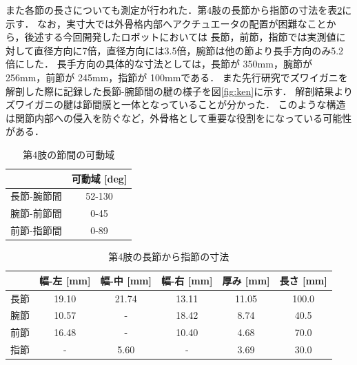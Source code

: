 また各節の長さについても測定が行われた．第4肢の長節から指節の寸法を表\ref{tab:4setu}に示す．
なお，実寸大では外骨格内部へアクチュエータの配置が困難なことから，後述する今回開発したロボットにおいては
長節，前節，指節では実測値に対して直径方向に7倍，直径方向には3.5倍，腕節は他の節より長手方向のみ5.2倍にした．
長手方向の具体的な寸法としては，長節が 350mm，腕節が 256mm，前節が 245mm，指節が 100mmである．
また先行研究\cite{hasegawa}でズワイガニを解剖した際に記録した長節-腕節間の腱の様子を図\ref{fig:ken}に示す．
解剖結果よりズワイガニの腱は節間膜と一体となっていることが分かった\cite{hasegawa}．
このような構造は関節内部への侵入を防ぐなど，外骨格として重要な役割をになっている可能性がある．
\begin{table}[t]
  \centering
  \vspace{5mm}
  \caption{第4肢の節間の可動域}
  \label{tab:4setukadou}
  \vspace{-3mm}
  \begin{tabular}{|l|c|}
  \hline
         & \multicolumn{1}{l|}{可動域 {[}deg{]}} \\ \hline
  長節-腕節間 & 52-130                            \\ \hline
  腕節-前節間 & 0-45                             \\ \hline
  前節-指節間 & 0-89                            \\ \hline
  \end{tabular}
\end{table}
\begin{table}[t]
  \centering
  \caption{第4肢の長節から指節の寸法}
  \label{tab:4setu}
  \vspace{-3mm}
  \begin{tabular}{|l|c|c|c|c|c|}
  \hline
     & \multicolumn{1}{l|}{幅-左 [mm]} & \multicolumn{1}{l|}{幅-中 [mm]} & \multicolumn{1}{l|}{幅-右 [mm]} & \multicolumn{1}{l|}{厚み [mm]} & \multicolumn{1}{l|}{長さ [mm]} \\ \hline
  長節 & 19.10                       & 21.74                       & 13.11                       & 11.05                       & 100.0                       \\ \hline
  腕節 & 10.57                       & -                           & 18.42                       & 8.74                        & 40.5                        \\ \hline
  前節 & 16.48                       & -                           & 10.40                       & 4.68                        & 70.0                        \\ \hline
  指節 & -                           & 5.60                        & -                           & 3.69                        & 30.0                        \\ \hline
  \end{tabular}
\end{table}
